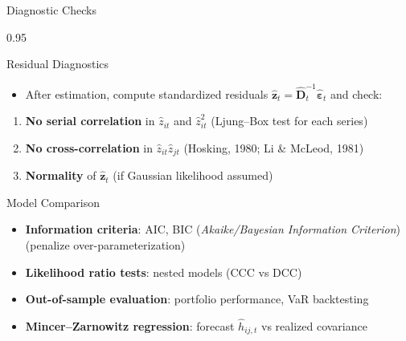 \documentclass[9pt, aspectratio=169, t]{beamer}
\begin{document}
\begin{frame}{Diagnostic Checks}
    \begin{cminipage}{0.95\textwidth}
    {\footnotesize
    \begin{block}{Residual Diagnostics}
        \begin{itemize}\setlength{\itemsep}{0pt}
            \item After estimation, compute standardized residuals $\hat{\mathbf{z}}_t = \hat{\mathbf{D}}_t^{-1}\hat{\boldsymbol{\varepsilon}}_t$ and check:
        \end{itemize}
        \begin{enumerate}\setlength{\itemsep}{0pt}
            \item \textbf{No serial correlation} in $\hat{z}_{it}$ and $\hat{z}_{it}^2$ (Ljung--Box test for each series)
            \item \textbf{No cross-correlation} in $\hat{z}_{it}\hat{z}_{jt}$ (Hosking, 1980; Li \& McLeod, 1981)
            \item \textbf{Normality} of $\hat{\mathbf{z}}_t$ (if Gaussian likelihood assumed)
        \end{enumerate}
    \end{block}
    \vspace{0.1cm}
    \begin{block}{Model Comparison}
        \begin{itemize}\setlength{\itemsep}{0pt}
            \item \textbf{Information criteria}: AIC, BIC (\textit{Akaike/Bayesian Information Criterion}) (penalize over-parameterization)
            \item \textbf{Likelihood ratio tests}: nested models (CCC vs DCC)
            \item \textbf{Out-of-sample evaluation}: portfolio performance, VaR backtesting
            \item \textbf{Mincer--Zarnowitz regression}: forecast $\hat{h}_{ij,t}$ vs realized covariance
        \end{itemize}
    \end{block}
    }
    \end{cminipage}
\end{frame}
\end{document}
